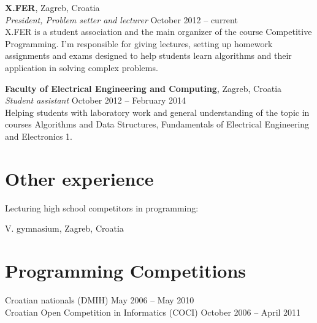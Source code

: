 \documentclass[margin,line]{resume}
\begin{document}
\begin{resume}
\textbf{X.FER}, Zagreb, Croatia \vspace{2mm}\\\vspace{1mm}%
\textsl{President, Problem setter and lecturer} \hfill October 2012 -- current\\%
X.FER is a student association and the main organizer of the course Competitive Programming. I'm responsible for giving lectures, setting up homework assignments and exams designed to help students learn algorithms and their application in solving complex problems.


\textbf{Faculty of Electrical Engineering and Computing}, Zagreb, Croatia \vspace{2mm}\\\vspace{1mm}%
\textsl{Student assistant} \hfill October 2012 -- February 2014\\%
Helping students with laboratory work and general understanding of the topic in courses Algorithms  and  Data  Structures,
Fundamentals  of  Electrical  Engineering and  Electronics  1.

\vspace{1mm}

\section{\mysidestyle Other experience}

Lecturing high school competitors in programming:
\begin{list2}
\item V. gymnasium, Zagreb, Croatia
\end{list2}

\vspace{2mm}
\section{\mysidestyle Programming Competitions} 

Croatian nationals (DMIH) \hfill May 2006 -- May 2010\\%
Croatian Open Competition in Informatics (COCI) \hfill October 2006 -- April 2011\\%


\end{resume}
\end{document}
